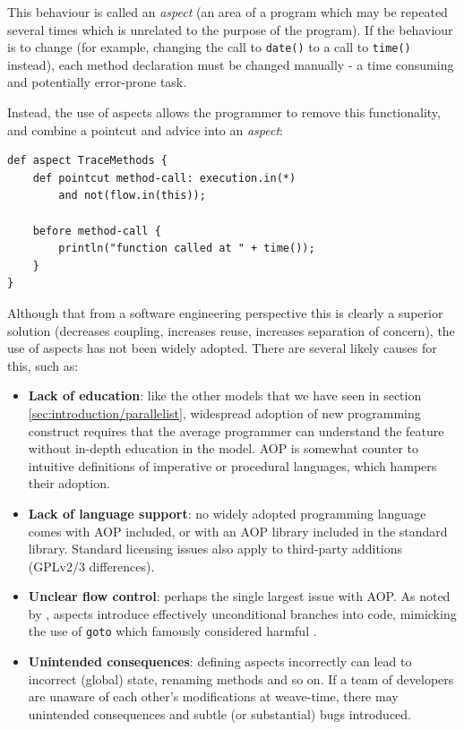 	This behaviour is called an \textit{aspect} (an area of a program which may be repeated several times which is unrelated to the purpose of the program). If the behaviour is to change (\eg for example, changing the call to \texttt{date()} to a call to \texttt{time()} instead), each method declaration must be changed manually - a time consuming and potentially error-prone task.
	
	Instead, the use of aspects allows the programmer to remove this functionality, and combine a pointcut and advice into an \textit{aspect}:
	
	\begin{lstlisting}[caption=AOP-based advice equivalent to listing \ref{lst:tradadvice},label=lst:aopadvice]
def aspect TraceMethods {
    def pointcut method-call: execution.in(*)
        and not(flow.in(this));
		
    before method-call {
        println("function called at " + time());
    }
}\end{lstlisting}
	
	Although that from a software engineering perspective this is clearly a superior solution (decreases coupling, increases reuse, increases separation of concern), the use of aspects has not been widely adopted. There are several likely causes for this, such as:
	
	\begin{itemize}
		\item \textbf{Lack of education}: like the other models that we have seen in section \ref{sec:introduction/parallelist}, widespread adoption of new programming construct requires that the average programmer can understand the feature without in-depth education in the model. AOP is somewhat counter to intuitive definitions of imperative or procedural languages, which hampers their adoption.
		\item \textbf{Lack of language support}: no widely adopted programming language comes with AOP included, or with an AOP library included in the standard library. Standard licensing issues also apply to third-party additions (\eg GPLv2/3 differences).
		\item \textbf{Unclear flow control}: perhaps the single largest issue with AOP. As noted by \citet{Constantinides2004}, aspects introduce effectively unconditional branches into code, mimicking the use of \texttt{goto} which \citeauthor{Dijkstra1968} famously considered harmful \citep{Dijkstra1968}.
		\item \textbf{Unintended consequences}: defining aspects incorrectly can lead to incorrect (global) state, \eg renaming methods and so on. If a team of developers are unaware of each other's modifications at weave-time, there may unintended consequences and subtle (or substantial) bugs introduced.
	\end{itemize}
	
